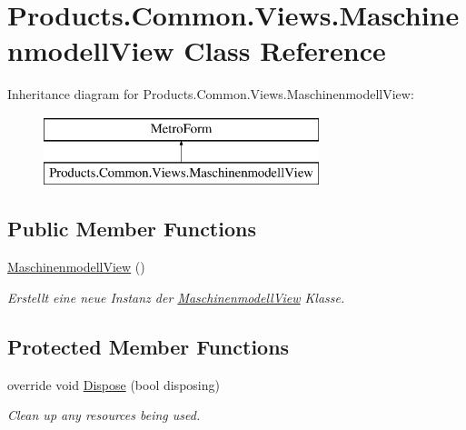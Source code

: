 \hypertarget{class_products_1_1_common_1_1_views_1_1_maschinenmodell_view}{}\section{Products.\+Common.\+Views.\+Maschinenmodell\+View Class Reference}
\label{class_products_1_1_common_1_1_views_1_1_maschinenmodell_view}
Inheritance diagram for Products.\+Common.\+Views.\+Maschinenmodell\+View\+:\begin{figure}[H]
\begin{center}
\leavevmode
\includegraphics[height=2.000000cm]{class_products_1_1_common_1_1_views_1_1_maschinenmodell_view}
\end{center}
\end{figure}
\subsection*{Public Member Functions}
\begin{DoxyCompactItemize}
\item 
\hyperlink{class_products_1_1_common_1_1_views_1_1_maschinenmodell_view_a9991f9e38650c855751b4d8a6fe9b7a5}{Maschinenmodell\+View} ()
\begin{DoxyCompactList}\small\item\em Erstellt eine neue Instanz der \hyperlink{class_products_1_1_common_1_1_views_1_1_maschinenmodell_view}{Maschinenmodell\+View} Klasse. \end{DoxyCompactList}\end{DoxyCompactItemize}
\subsection*{Protected Member Functions}
\begin{DoxyCompactItemize}
\item 
override void \hyperlink{class_products_1_1_common_1_1_views_1_1_maschinenmodell_view_a4f75d46d436f9b05809ba8c615036e24}{Dispose} (bool disposing)
\begin{DoxyCompactList}\small\item\em Clean up any resources being used. \end{DoxyCompactList}\end{DoxyCompactItemize}


